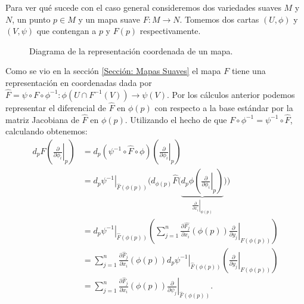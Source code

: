 Para ver qué sucede con el caso general consideremos dos variedades suaves $M$ y $N$, un punto $p \in M$ y un mapa suave $F: M \to N$. Tomemos dos cartas $(U,\phi)$ y $(V,\psi)$ que contengan a $p$ y $F(p)$ respectivamente.
\begin{figure}[h]
  \center
	
	\caption*{Diagrama de la representación coordenada de un mapa.}
\end{figure}
Como se vio en la sección \ref{Sección: Mapas Suaves} el mapa $F$ tiene una representación en coordenadas dada por $\hat{F} = \psi \circ F \circ \phi^{-1}: \phi(U \cap F^{-1}(V)) \to \psi(V)$. Por los cálculos anterior podemos representar el diferencial de $\hat{F}$ en $\phi(p)$ con respecto a la base estándar por la matriz Jacobiana de $\hat{F}$ en $\phi(p)$. Utilizando el hecho de que $F \circ \phi^{-1} = \psi^{-1} \circ \hat{F}$, calculando obtenemos:
\begin{align*}
	d_{p}F \left( \left. \frac{\partial}{\partial \phi_i} \right|_{p}\right) & =
	d_p(\psi^{-1}\circ\hat{F}\circ \phi)\left(\left.\frac{\partial}{\partial \phi_i}\right |_p\right) \\
	                                                                         & =
	\left. d_p \psi^{-1} \right|_{\hat{F}(\phi(p))}
	\Biggl(
	d_{\phi(p)} \hat{F}
	\Biggl(
	\underbrace{d_p \phi
		\left(
		\left. \frac{\partial}{\partial \phi_i} \right|_{p}
		\right)}_{\left. \frac{\partial}{\partial x_i} \right|_{\phi (p)}}
	\Biggr)	\Biggr)                                                                                   \\
	                                                                         & =
	\left. d_p \psi^{-1} \right|_{\hat{F}(\phi(p))}
	\left(
	\sum_{j=1}^{n} \frac{\partial \hat{F_j}}{\partial x_i} \left( \phi(p) \right)
	\left. \frac{\partial}{\partial y_j} \right|_{F(\phi(p))}
	\right)                                                                                           \\
	                                                                         & =
	\sum_{j=1}^{n} \frac{\partial \hat{F}_j}{\partial x_i} (\phi(p))
	\left. d_p \psi^{-1} \right|_{\hat{F}(\phi(p))}
	\left(
	\left. \frac{\partial}{\partial y_j}\right|_{F(\phi(p))}
	\right)                                                                                           \\
	                                                                         & =
	\sum_{j=1}^{n} \frac{\partial \hat{F}_j}{\partial x_i} (\phi(p))
	\left.
	\frac{\partial}{\partial \psi_{j}}
	\right|_{\hat{F}(\phi(p))}.
\end{align*}

